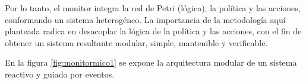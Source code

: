 Por lo tanto, el monitor integra la red de Petri (lógica), la política y las acciones, conformando un sistema heterogéneo. La importancia de la metodología aquí planteada radica en desacoplar la lógica de la política y las acciones, con el fin de obtener un sistema resultante modular, simple, mantenible y verificable. 

En la figura \ref{fig:monitormico1} se expone la arquitectura modular de un sistema reactivo y guiado por eventos.